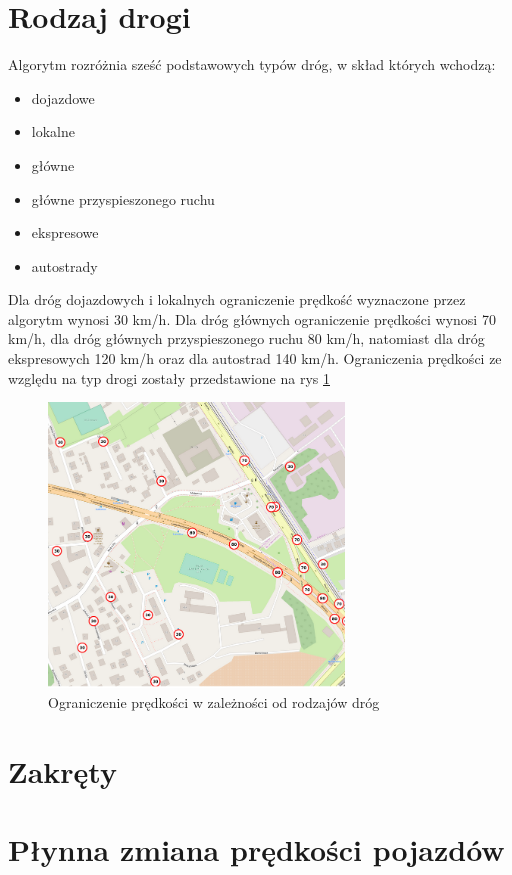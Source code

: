 \newpage
\section{Rodzaj drogi}
Algorytm rozróżnia sześć podstawowych typów dróg, w skład których wchodzą:
\begin{itemize}
\item dojazdowe
\item lokalne
\item główne
\item główne przyspieszonego ruchu
\item ekspresowe
\item autostrady
\end{itemize}

Dla dróg dojazdowych i lokalnych ograniczenie prędkość wyznaczone przez algorytm wynosi 30 km/h. Dla dróg głównych ograniczenie prędkości wynosi 70 km/h, dla dróg głównych przyspieszonego ruchu 80 km/h, natomiast dla dróg ekspresowych 120 km/h oraz dla autostrad 140 km/h. Ograniczenia prędkości ze względu na typ drogi zostały przedstawione na rys \ref{sec:typeOfRoad}
\begin{figure}[h]
\caption{Ograniczenie prędkości w zależności od rodzajów dróg}
\label{sec:typeOfRoad}
\centering
\includegraphics[width=0.7\textwidth]{typeOfRoad}
\end{figure}

\newpage
\section{Zakręty}

\newpage
\section{Płynna zmiana prędkości pojazdów}


